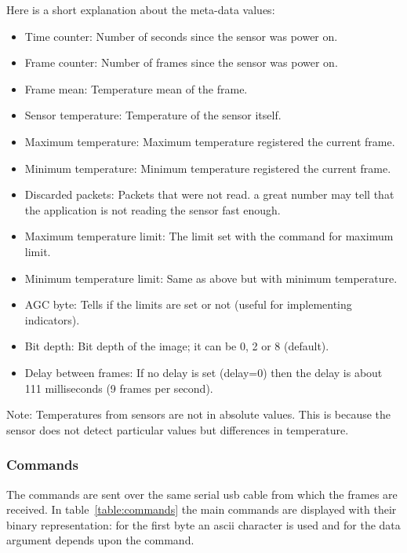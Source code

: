 \documentclass[hidelinks,11pt,a4paper,oneside,article]{memoir}
\begin{document}
Here is a short explanation about the meta-data values:
\begin{itemize}
    \item Time counter: Number of seconds since the sensor was power on.
    \item Frame counter: Number of frames since the sensor was power on.
    \item Frame mean: Temperature mean of the frame.
    \item Sensor temperature: Temperature of the sensor itself.
    \item Maximum temperature: Maximum temperature registered the current frame.
    \item Minimum temperature: Minimum temperature registered the current frame.
    \item Discarded packets: Packets that were not read. a great number may tell that the application is not reading the sensor fast enough.
    \item Maximum temperature limit: The limit set with the command for maximum limit.
    \item Minimum temperature limit: Same as above but with minimum temperature.
    \item AGC byte: Tells if the limits are set or not (useful for implementing indicators).
    \item Bit depth: Bit depth of the image; it can be 0, 2 or 8 (default).
    \item Delay between frames: If no delay is set (delay=0) then the delay is about 111 milliseconds (9 frames per second).
\end{itemize}
Note: Temperatures from sensors are not in absolute values. This is because the sensor does not detect particular values but differences in temperature.

\subsubsection{Commands} \label{commands}
The commands are sent over the same serial \gls{usb} cable from which the frames are received. In table~\ref{table:commands} the main commands are displayed with their binary representation: for the first byte an \gls{ascii} character is used and for the data argument depends upon the command.
\end{document}
